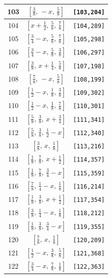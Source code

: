 \documentclass[fleqn,8pt]{jsarticle}
\begin{document}
\begin{longtable}{ccc}
103 & $\left[ \frac{3}{8},\, - x,\, \frac{5}{8} \right]$ & {\tt [103,204]} \\ \hline
104 & $\left[ x + \frac{1}{2},\, \frac{5}{8},\, \frac{7}{8} \right]$ & {\tt [104,289]} \\ \hline
105 & $\left[ \frac{3}{4} - x,\, \frac{5}{8},\, \frac{7}{8} \right]$ & {\tt [105,298]} \\ \hline
106 & $\left[ \frac{3}{4} - x,\, \frac{5}{8},\, \frac{3}{8} \right]$ & {\tt [106,297]} \\ \hline
107 & $\left[ \frac{3}{8},\, x + \frac{1}{4},\, \frac{5}{8} \right]$ & {\tt [107,198]} \\ \hline
108 & $\left[ \frac{7}{8},\, - x,\, \frac{5}{8} \right]$ & {\tt [108,199]} \\ \hline
109 & $\left[ \frac{1}{2} - x,\, \frac{1}{8},\, \frac{3}{8} \right]$ & {\tt [109,302]} \\ \hline
110 & $\left[ \frac{1}{2} - x,\, \frac{1}{8},\, \frac{7}{8} \right]$ & {\tt [110,301]} \\ \hline
111 & $\left[ \frac{5}{8},\, \frac{3}{8},\, x + \frac{3}{4} \right]$ & {\tt [111,341]} \\ \hline
112 & $\left[ \frac{5}{8},\, \frac{3}{8},\, \frac{1}{2} - x \right]$ & {\tt [112,340]} \\ \hline
113 & $\left[ \frac{3}{8},\, x,\, \frac{1}{8} \right]$ & {\tt [113,216]} \\ \hline
114 & $\left[ \frac{1}{8},\, \frac{7}{8},\, x + \frac{1}{2} \right]$ & {\tt [114,357]} \\ \hline
115 & $\left[ \frac{1}{8},\, \frac{7}{8},\, \frac{3}{4} - x \right]$ & {\tt [115,359]} \\ \hline
116 & $\left[ \frac{7}{8},\, \frac{1}{4} - x,\, \frac{1}{8} \right]$ & {\tt [116,214]} \\ \hline
117 & $\left[ \frac{1}{8},\, \frac{3}{8},\, x + \frac{1}{2} \right]$ & {\tt [117,354]} \\ \hline
118 & $\left[ \frac{3}{8},\, \frac{1}{4} - x,\, \frac{1}{8} \right]$ & {\tt [118,212]} \\ \hline
119 & $\left[ \frac{1}{8},\, \frac{3}{8},\, \frac{3}{4} - x \right]$ & {\tt [119,355]} \\ \hline
120 & $\left[ \frac{7}{8},\, x,\, \frac{1}{8} \right]$ & {\tt [120,209]} \\ \hline
121 & $\left[ \frac{1}{2} - x,\, \frac{3}{8},\, \frac{5}{8} \right]$ & {\tt [121,368]} \\ \hline
122 & $\left[ \frac{3}{4} - x,\, \frac{7}{8},\, \frac{1}{8} \right]$ & {\tt [122,363]} \\ \hline

\end{longtable}
\end{document}
